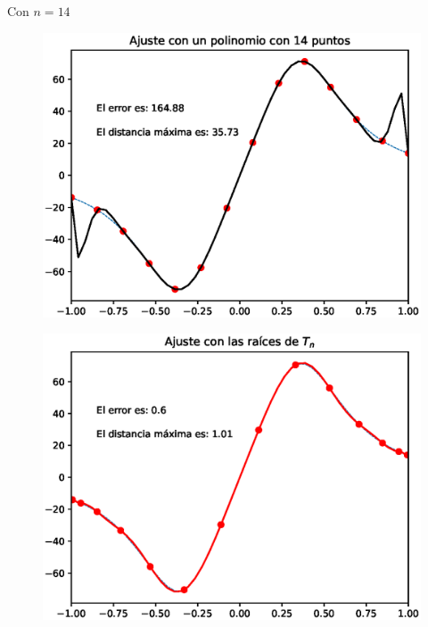 Con $n = 14$
\\
\begin{minipage}{0.45\linewidth}
    \begin{figure}[H]
    \centering
    \includegraphics[scale=0.44]{Imagenes/Interpolacion_Chebychev_14_Polinomio.eps}
    \end{figure}       
\end{minipage}
\hspace{0.1cm}
\begin{minipage}{0.45\linewidth}
\begin{figure}[H]
    \centering
    \includegraphics[scale=0.44]{Imagenes/Interpolacion_Chebychev_14_Raices.eps}
\end{figure}
\end{minipage}

